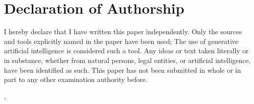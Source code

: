 \section*{Declaration of Authorship}

I hereby declare that I have written this paper independently. Only the sources and tools explicitly named in the paper have been used; The use of generative artificial intelligence
is considered such a tool. Any ideas or text taken literally or in substance, whether from natural persons, legal entities, or artificial intelligence, have been identified as such. 
This paper has not been submitted in whole or in part to any other examination authority before.

\vspace{10mm}

\Ort, \Abgabedatum
\vspace{3mm}
\begin{flushleft}
   \AutorUnterschrift
\end{flushleft}
\vspace{-20mm} 
\underline{\hspace{8cm}}\\ \Autor
